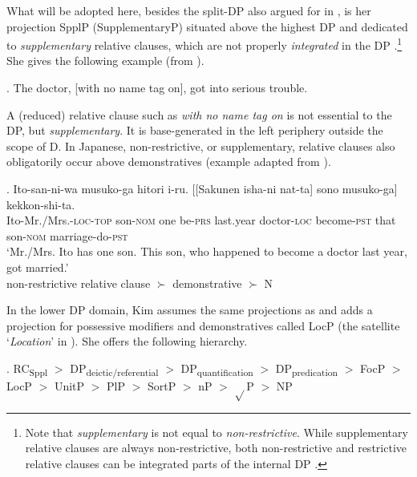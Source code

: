 What will be adopted here, besides the split-DP also argued for in \citet{laenzlinger:2005:french, laenzlinger:2011:elements}, is her projection SpplP (SupplementaryP) situated above the highest DP and dedicated to \textit{supplementary} relative clauses, which are not properly \textit{integrated} in the DP \citep[116–119]{kim:2019:syntax}.\footnote{Note that \textit{supplementary} is not equal to \textit{non-restrictive}. While supplementary relative clauses are always non-restrictive, both non-restrictive and restrictive relative clauses can be integrated parts of the internal DP \citep[120]{kim:2019:syntax}.} She gives the following example (from \citealt{huddleston:2005:student}).

\ex. The doctor, [with no name tag on], got into serious trouble. \\ \null \hfill \citep[117]{kim:2019:syntax}

A (reduced) relative clause such as \textit{with no name tag on} is not essential to the DP, but \textit{supplementary}. It is base-generated in the left periphery outside the scope of D. In Japanese, non-restrictive, or supplementary, relative clauses also obligatorily occur above demonstratives (example adapted from \citealt[7–8]{ishizuka:2008:RC}).

\exg. Ito-san-ni-wa musuko-ga hitori i-ru. [[Sakunen isha-ni nat-ta] sono musuko-ga] kekkon-shi-ta.\\
Ito-Mr./Mrs.-\textsc{loc-top} son-\textsc{nom} one be-\textsc{prs} last.year doctor-\textsc{loc} become-\textsc{pst} that son-\textsc{nom} marriage-do-\textsc{pst}\\
`Mr./Mrs. Ito has one son. This son, who happened to become a doctor last year, got married.' \\ \null \hfill non-restrictive relative clause $\succ$ demonstrative $\succ$ N

In the lower DP domain, Kim assumes the same projections as \citet{svenonius:2008:position} and adds a projection for possessive modifiers and demonstratives called LocP (the satellite `\textit{Location}’ in \citet{rijkhoff:2002:noun}). She offers the following hierarchy.

\ex. {RC\textsubscript{Sppl}} $>$ DP\textsubscript{deictic/referential} $>$ DP\textsubscript{quantification} $>$ DP\textsubscript{predication} $>$ FocP $>$ LocP $>$ UnitP $>$ PlP $>$ SortP $>$ nP $>$ $\sqrt{}$P $>$ NP \null \hfill \citep[132]{kim:2019:syntax}

